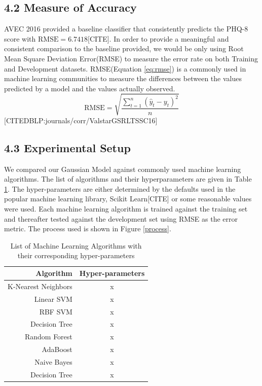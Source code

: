 \documentclass{article}
\begin{document}
 	\subsection{4.2	Measure of Accuracy}
	AVEC 2016 provided a baseline classifier that consistently predicts the PHQ-8 score with $\text{RMSE}=6.7418$[CITE]. In order to provide a meaningful and consistent comparison to the baseline provided, we would be only using Root Mean Square Deviation Error(RMSE) to measure the error rate on both Training and Development datasets. RMSE(Equation \ref{eq:rmse}) is a commonly used in machine learning communities to measure the differences between the values predicted by a model and the values actually observed. 
	\begin{equation}\label{eq:rmse}
  	\text{RMSE} = \sqrt{\frac{\sum_{t=1}^n (\hat y_t - y_t)^2}{n}}
 	\end{equation}
	[CITEDBLP:journals/corr/ValstarGSRLTSSC16]

	\subsection{4.3	Experimental Setup}
	We compared our Gaussian Model against commonly used machine learning algorithms. The list of algorithms and their hyperparameters are given in Table \ref{list_mls}. The hyper-parameters are either determined by the defaults used in the popular machine learning library, Scikit Learn[CITE] or some reasonable values were used. Each machine learning algorithm is trained against the training set and thereafter tested against the development set using RMSE as the error metric. The process used is shown in Figure \ref{process}.

	\begin{table}[h]
  		\begin{center}
   			\begin{tabular}{ | r | c |}
	    		\hline
			Algorithm & Hyper-parameters \\ \hline\hline
			K-Nearest Neighbors        & x \\ \hline
			Linear SVM                 & x \\ \hline
			RBF SVM                    & x \\ \hline
			Decision Tree              & x \\ \hline
			Random Forest              & x \\ \hline
			AdaBoost                   & x \\ \hline
			Naive Bayes                & x \\ \hline
			Decision Tree              & x \\ \hline
			\end{tabular}
		\end{center}
		\caption{List of Machine Learning Algorithms with their corresponding hyper-parameters}
		\label{list_mls}
	\end{table}
\end{document}
